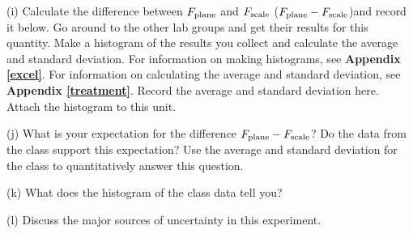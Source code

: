 (i) Calculate the difference between \( F_{\rm plane} \) and \( F_{\rm scale} \) (\( F_{\rm plane} - F_{\rm scale} \))and record it below.
Go around to the other lab groups and get their results for this quantity.
Make a histogram of the results you collect and calculate the average and standard deviation.
For information on making histograms, see \textbf{Appendix \ref{excel}}. For information on calculating the average and
standard deviation, see \textbf{Appendix \ref{treatment}}. Record the average and standard deviation here.
Attach the histogram to this unit.
\vspace{30mm}

(j) What is your expectation for the difference \( F_{\rm plane} - F_{\rm scale} \)?
Do the data from the class support this expectation? 
Use the average and standard deviation for the class to quantitatively answer this question.
\vspace{20mm}

(k) What does the histogram of the class data tell you?
\vspace{20mm}

(l) Discuss the major sources of uncertainty in this experiment.
\vspace{15mm}

